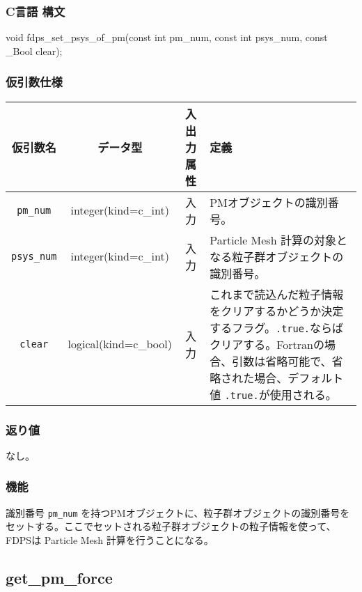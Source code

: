 \subsubsection*{C言語 構文}
\begin{screen}
\begin{spverbatim}
void fdps_set_psys_of_pm(const int pm_num,
                         const int psys_num,
                         const _Bool clear);
\end{spverbatim}
\end{screen}

\subsubsection*{仮引数仕様}
\begin{table}[h]
\begin{tabularx}{\linewidth}{cccX}
\toprule
\rowcolor{Snow2}
仮引数名 & データ型 & 入出力属性 & 定義 \\
\midrule
\texttt{pm\_num} & integer(kind=c\_int) & 入力 & PMオブジェクトの識別番号。\\
\texttt{psys\_num} & integer(kind=c\_int) & 入力 & Particle Mesh 計算の対象となる粒子群オブジェクトの識別番号。\\
\texttt{clear} & logical(kind=c\_bool) & 入力 & これまで読込んだ粒子情報をクリアするかどうか決定するフラグ。\texttt{.true.}ならばクリアする。Fortranの場合、引数は省略可能で、省略された場合、デフォルト値 \texttt{.true.}が使用される。\\
\bottomrule
\end{tabularx}
\end{table}

\subsubsection*{返り値}
なし。

\subsubsection*{機能}
識別番号 \texttt{pm\_num} を持つPMオブジェクトに、粒子群オブジェクトの識別番号をセットする。ここでセットされる粒子群オブジェクトの粒子情報を使って、FDPSは Particle Mesh 計算を行うことになる。
\clearpage

\subsection{get\_pm\_force}

